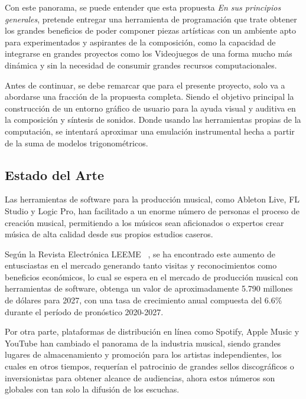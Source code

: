 \documentclass{book}
\begin{document}
	Con este panorama, se puede entender que esta propuesta \emph{En sus principios generales}, pretende entregar una herramienta de programación que trate obtener los grandes beneficios de poder componer piezas artísticas con un ambiente apto para experimentados y aspirantes de la composición, como la capacidad de integrarse en grandes proyectos como los Videojuegos de una forma mucho más dinámica y sin la necesidad de consumir grandes recursos computacionales.\par
	
	Antes de continuar, se debe remarcar que para el presente proyecto, solo va a abordarse una fracción de la propuesta completa. Siendo el objetivo principal la construcción de un entorno gráfico de usuario para la ayuda visual y auditiva en la composición y síntesis de sonidos. Donde usando las herramientas propias de la computación, se intentará aproximar una emulación instrumental hecha a partir de la suma de modelos trigonométricos.\par
	
	\pagebreak\subsection*{Estado del Arte}
	Las herramientas de software para la producción musical, como Ableton Live, FL Studio y Logic Pro, han facilitado a un enorme número de personas el proceso de creación musical, permitiendo a los músicos sean aficionados o expertos crear música de alta calidad desde sus propios estudios caseros.\par
	
	Según la Revista Electrónica LEEME ~\cite{produccion2020}, se ha encontrado este aumento de entusciastas en el mercado generando tanto visitas y reconocimientos como beneficios económicos, lo cual se espera en el mercado de producción musical con herramientas de software, obtenga un valor de aproximadamente 5.790 millones de dólares para 2027, con una tasa de crecimiento anual compuesta del 6.6\% durante el período de pronóstico 2020-2027.\par 
	
	Por otra parte, plataformas de distribución en línea como Spotify, Apple Music y YouTube han cambiado el panorama de la industria musical, siendo grandes lugares de almacenamiento y promoción para los artistas independientes, los cuales en otros tiempos, requerían el patrocinio de grandes sellos discográficos o inversionistas para obtener alcance de audiencias, ahora estos números son globales con tan solo la difusión de los escuchas.\par 
	
\end{document}
